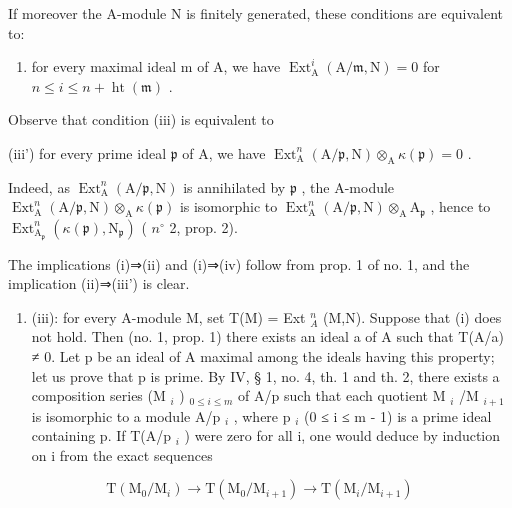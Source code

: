 If moreover the A-module N is finitely generated, these conditions are equivalent to:

\begin{enumerate}
\def\labelenumi{(\roman{enumi})}
\setcounter{enumi}{3}
\tightlist
\item
  for every maximal ideal m of A, we have \(\operatorname{Ext}_{\mathrm{A}}^{i}(\mathrm{A}/\mathfrak{m},\mathrm{N})=0\) for \(n\leqslant i\leqslant n+\operatorname{ht}(\mathfrak{m})\) .
\end{enumerate}

Observe that condition (iii) is equivalent to

(iii') for every prime ideal \(\mathfrak{p}\) of A, we have \(\operatorname{Ext}_{\mathrm{A}}^{n}(\mathrm{A}/\mathfrak{p},\mathrm{N})\otimes_{\mathrm{A}}\kappa(\mathfrak{p})=0\) .

Indeed, as \(\operatorname{Ext}_{\mathrm{A}}^{n}(\mathrm{A}/\mathfrak{p},\mathrm{N})\) is annihilated by \(\mathfrak{p}\) , the A-module \(\operatorname{Ext}_{\mathrm{A}}^{n}(\mathrm{A}/\mathfrak{p},\mathrm{N})\otimes_{\mathrm{A}}\kappa(\mathfrak{p})\) is isomorphic to \(\operatorname{Ext}_{\mathrm{A}}^{n}(\mathrm{A}/\mathfrak{p},\mathrm{N})\otimes_{\mathrm{A}}\mathrm{A}_{\mathfrak{p}}\) , hence to \(\operatorname{Ext}_{\mathrm{A}_{\mathfrak{p}}}^{n}(\kappa(\mathfrak{p}),\mathrm{N}_{\mathfrak{p}})\) ( \(n^{\circ}\) 2, prop. 2).

The implications (i)⇒(ii) and (i)⇒(iv) follow from prop. 1 of no. 1, and the implication (ii)⇒(iii') is clear.

\begin{enumerate}
\def\labelenumi{(\roman{enumi})}
\setcounter{enumi}{2}
\tightlist
\item
  (iii): for every A-module M, set T(M) = Ext \(_{A}^{n}\) (M,N). Suppose that (i) does not hold. Then (no. 1, prop. 1) there exists an ideal a of A such that T(A/a) ≠ 0. Let p be an ideal of A maximal among the ideals having this property; let us prove that p is prime. By IV, § 1, no. 4, th. 1 and th. 2, there exists a composition series (M \(_{i}\) ) \(_{0\leqslant i\leqslant m}\) of A/p such that each quotient M \(_{i}\) /M \(_{i+1}\) is isomorphic to a module A/p \(_{i}\) , where p \(_{i}\) (0 ≤ i ≤ m - 1) is a prime ideal containing p. If T(A/p \(_{i}\) ) were zero for all i, one would deduce by induction on i from the exact sequences
\end{enumerate}

\[
\mathrm{T} \left(\mathrm{M} _ {0} / \mathrm{M} _ {i}\right) \longrightarrow \mathrm{T} \left(\mathrm{M} _ {0} / \mathrm{M} _ {i + 1}\right) \longrightarrow \mathrm{T} \left(\mathrm{M} _ {i} / \mathrm{M} _ {i + 1}\right)
\]

